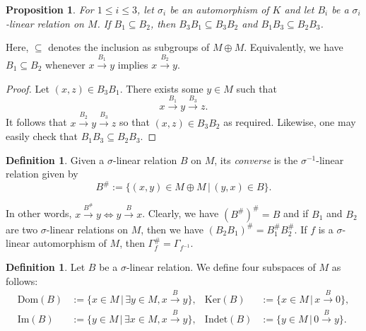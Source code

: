 \documentclass[12pt]{amsart}
\newtheorem{proposition}[theorem]{Proposition}
\theoremstyle{definition}
\newtheorem{definition}[theorem]{Definition}
\newcommand{\<}{\langle}   %
\renewcommand{\>}{\rangle} %
\begin{document}
\begin{proposition}\label{UsefulProp}
    For $1 \leq i \leq 3$, let $\sigma_i$ be an automorphism of $K$ and let $B_i$ be a $\sigma_i$-linear relation on $M$. If $B_1 \subseteq  B_2$, then $B_3B_1 \subseteq  B_3B_2$ and $B_1B_3 \subseteq  B_2B_3$.
\end{proposition}

Here, $\subseteq $ denotes the inclusion as subgroups of $M\oplus M$. Equivalently, we have $B_1 \subseteq  B_2$ whenever $x \xrightarrow{B_1} y$ implies $x \xrightarrow{B_2} y$. 

\begin{proof}
    Let $(x,z) \in B_3B_1$. There exists some $y \in M$ such that 
    \begin{equation*}
    x \xrightarrow{B_1} y \xrightarrow{B_3} z.
    \end{equation*}
    It follows that $x \xrightarrow{B_2} y \xrightarrow{B_3} z$ so that $(x,z)  \in B_3B_2$ as required. Likewise, one may easily check that $B_1B_3 \subseteq  B_2B_3$.
\end{proof}

\begin{definition}
    Given a $\sigma$-linear relation $B$ on $M$, its \textit{converse} is the $\sigma^{-1}$-linear relation given by
    \begin{equation*}
        B^{\#} := \{(x,y) \in M\oplus M \,|\, (y,x) \in B\}.
    \end{equation*}
\end{definition}

In other words, $x\xrightarrow{B^{\#}} y \iff y \xrightarrow{B} x$. Clearly, we have $(B^{\#})^{\#} = B$ and if $B_1$ and $B_2$ are two $\sigma$-linear relations on $M$, then we have $(B_2B_1)^{\#} = B_1^{\#}B_2^{\#}$. If $f$ is a $\sigma$-linear automorphism of $M$, then $\Gamma_f^{\#} = \Gamma_{f^{-1}}$. 

\begin{definition}
    Let $B$ be a $\sigma$-linear relation. We define four subspaces of $M$ as follows:
    \begin{align*}
        \mathrm{Dom}(B) & := \{x \in M \,|\, \exists y \in M, x \xrightarrow{B} y\}, & \mathrm{Ker}(B) & := \{x \in M \,|\, x \xrightarrow{B} 0\},\\
        \mathrm{Im}(B) & := \{y \in M \,|\, \exists x \in M, x \xrightarrow{B} y\}, & \mathrm{Indet}(B) & := \{y \in M \,|\, 0 \xrightarrow{B} y\}.
    \end{align*}
\end{definition}
\end{document}

